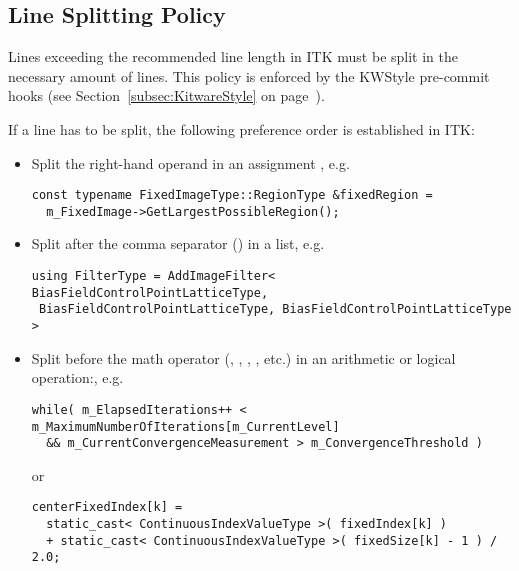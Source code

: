 \subsection{Line Splitting Policy}
\label{subsec:LineSplittingPolicy}

Lines exceeding the recommended line length in ITK must be split in the
necessary amount of lines. This policy is enforced by the KWStyle pre-commit
hooks (see Section~\ref{subsec:KitwareStyle} on
page~\pageref{subsec:KitwareStyle}).

If a line has to be split, the following preference order is established in ITK:
\begin{itemize}
\item Split the right-hand operand in an assignment \code{=}, e.g.

\small
\begin{verbatim}
const typename FixedImageType::RegionType &fixedRegion =
  m_FixedImage->GetLargestPossibleRegion();
\end{verbatim}
\normalsize

\item Split after the comma separator (\code{,}) in a list, e.g.

\small
\begin{verbatim}
using FilterType = AddImageFilter< BiasFieldControlPointLatticeType,
 BiasFieldControlPointLatticeType, BiasFieldControlPointLatticeType >
\end{verbatim}
\normalsize

\item Split before the math operator (\code{+}, \code{*}, \code{||}, \code{\&\&},
etc.) in an arithmetic or logical operation:, e.g.

\small
\begin{verbatim}
while( m_ElapsedIterations++ < m_MaximumNumberOfIterations[m_CurrentLevel]
  && m_CurrentConvergenceMeasurement > m_ConvergenceThreshold )
\end{verbatim}
\normalsize

or

\small
\begin{verbatim}
centerFixedIndex[k] =
  static_cast< ContinuousIndexValueType >( fixedIndex[k] )
  + static_cast< ContinuousIndexValueType >( fixedSize[k] - 1 ) / 2.0;
\end{verbatim}
\normalsize

\end{itemize}


